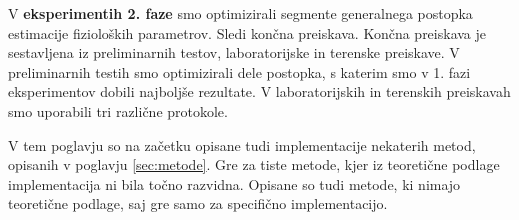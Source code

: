V \textbf{eksperimentih 2. faze} smo optimizirali segmente generalnega postopka estimacije fizioloških parametrov. Sledi končna preiskava. Končna preiskava je sestavljena iz preliminarnih testov, laboratorijske in terenske preiskave. V preliminarnih testih smo optimizirali dele postopka, s katerim smo v 1. fazi eksperimentov dobili najboljše rezultate. V laboratorijskih in terenskih preiskavah smo uporabili tri različne protokole.

V tem poglavju so na začetku opisane tudi implementacije nekaterih metod, opisanih v poglavju \ref{sec:metode}. Gre za tiste metode, kjer iz teoretične podlage implementacija ni bila točno razvidna. Opisane so tudi metode, ki nimajo teoretične podlage, saj gre samo za specifično implementacijo.


\renewcommand{\folder}{./pogl/03-eksperimenti}




